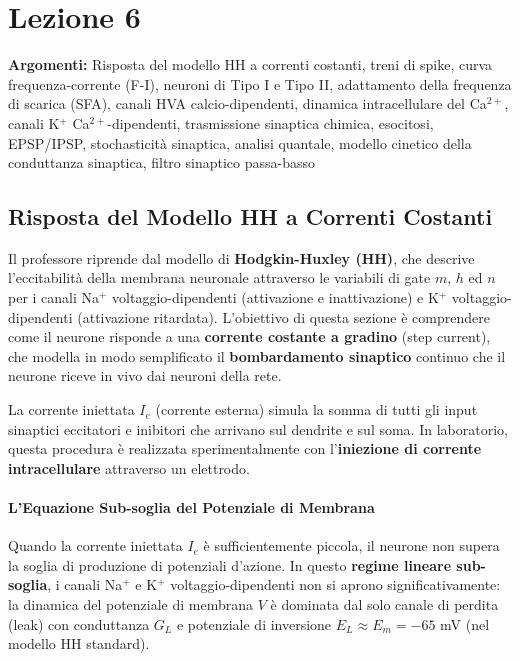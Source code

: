 \chapter{Lezione 6}

\textbf{Argomenti:} Risposta del modello HH a correnti costanti, treni di spike, curva frequenza-corrente (F-I), neuroni di Tipo I e Tipo II, adattamento della frequenza di scarica (SFA), canali HVA calcio-dipendenti, dinamica intracellulare del Ca$^{2+}$, canali K$^+$ Ca$^{2+}$-dipendenti, trasmissione sinaptica chimica, esocitosi, EPSP/IPSP, stochasticità sinaptica, analisi quantale, modello cinetico della conduttanza sinaptica, filtro sinaptico passa-basso

\section{Risposta del Modello HH a Correnti Costanti}

Il professore riprende dal modello di \textbf{Hodgkin-Huxley (HH)}, che descrive l'eccitabilità della membrana neuronale attraverso le variabili di gate $m$, $h$ ed $n$ per i canali Na$^+$ voltaggio-dipendenti (attivazione e inattivazione) e K$^+$ voltaggio-dipendenti (attivazione ritardata). L'obiettivo di questa sezione è comprendere come il neurone risponde a una \textbf{corrente costante a gradino} (step current), che modella in modo semplificato il \textbf{bombardamento sinaptico} continuo che il neurone riceve in vivo dai neuroni della rete.

La corrente iniettata $I_e$ (corrente esterna) simula la somma di tutti gli input sinaptici eccitatori e inibitori che arrivano sul dendrite e sul soma. In laboratorio, questa procedura è realizzata sperimentalmente con l'\textbf{iniezione di corrente intracellulare} attraverso un elettrodo.

\subsubsection{L'Equazione Sub-soglia del Potenziale di Membrana}

Quando la corrente iniettata $I_e$ è sufficientemente piccola, il neurone non supera la soglia di produzione di potenziali d'azione. In questo \textbf{regime lineare sub-soglia}, i canali Na$^+$ e K$^+$ voltaggio-dipendenti non si aprono significativamente: la dinamica del potenziale di membrana $V$ è dominata dal solo canale di perdita (leak) con conduttanza $G_L$ e potenziale di inversione $E_L \approx E_m = -65$ mV (nel modello HH standard).

